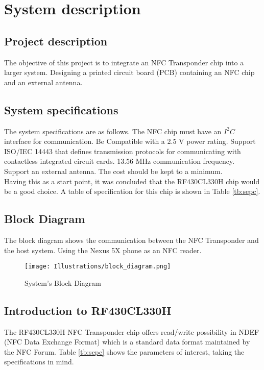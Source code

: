 \chapter{System description}
\section{{Project description}}
The objective of this project is to integrate an NFC Transponder chip into a larger system. Designing a printed circuit board (PCB) containing an NFC chip and an external antenna.
\section{System specifications}
The system specifications are as follows. The NFC chip must have an $I^2C$ interface for communication. Be Compatible with a 2.5 V power rating. Support ISO/IEC 14443 that defines transmission protocols for communicating with contactless integrated circuit cards. 13.56 MHz communication frequency. Support an external antenna. The cost should be kept to a minimum. \\

Having this as a start point, it was concluded that the RF430CL330H chip would be a good choice. A table of specification for this chip is shown in Table \ref{tb:sepc}.


\section{Block Diagram}
The block diagram shows the communication between the NFC Transponder and the host system. Using the Nexus 5X phone as an NFC reader.

\begin{figure}[h]
\begin{center}
\center
\texttt{[image: Illustrations/block\_diagram.png]}  
\caption{System's Block Diagram}
\label{eagle_package}
\end{center}
\end{figure}


\section{Introduction to RF430CL330H}


The RF430CL330H NFC Transponder chip offers read/write possibility in NDEF (NFC Data Exchange Format) which is a standard data format maintained by the NFC Forum.  Table \ref{tb:sepc} shows the parameters of interest, taking the specifications in mind.

